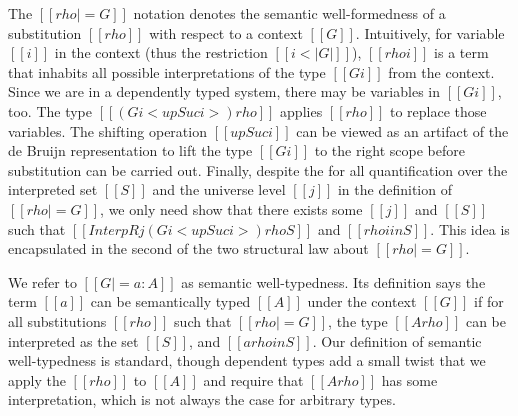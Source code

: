 \documentclass[acmsmall,screen=true,
\ifpublic review=false\else,review=true\fi
  ,anonymous=\ifanonymous true\else false\fi]{acmart}
\newcommand{\dotv}[2]{\href{#1}{\texttt{#1}}{\texttt{:#2}}}
\begin{document}
The $[[rho |= G]]$ notation denotes the semantic well-formedness of
a substitution $[[rho]]$ with respect to a context
$[[G]]$. Intuitively, for variable $[[i]]$ in the context (thus the
restriction $[[i < | G |]]$), $[[rho i]]$ is a term that inhabits all
possible interpretations of the type $[[G i]]$ from the
context.
Since we are in a dependently typed system, there
may be variables in $[[G i]]$, too. The type $[[(G i < up Suc i > ) {
  rho }]]$ applies $[[rho]]$ to replace those variables. The shifting
operation $[[up Suc i]]$ can be viewed as an artifact of the de Bruijn
representation to lift the type $[[G i]]$ to the right scope before
substitution can be carried out.
Finally, despite the for all quantification over the interpreted set
$[[S]]$ and the universe level $[[j]]$ in the definition of $[[rho |=
G]]$, we only need show that there exists some $[[j]]$ and $[[S]]$
such that $[[InterpR j (G i < up Suc i > ) { rho } S]]$ and $[[rho i
in S]]$. This idea is encapsulated in the second of the two structural
law about $[[rho |= G]]$.

We refer to $[[G |= a : A]]$ as semantic well-typedness. Its definition says the term $[[a]]$ can be
semantically typed $[[A]]$ under the context $[[G]]$ if for all
substitutions $[[rho]]$ such that $[[rho |= G]]$, the type $[[A { rho }]]$ can be interpreted
as the set $[[S]]$, and $[[a { rho } in S]]$. Our definition of
semantic well-typedness is standard, though dependent types add a
small twist that we apply the $[[rho]]$ to $[[A]]$ and require that
$[[A { rho }]]$ has some interpretation, which is not always the case
for arbitrary types.
\end{document}
